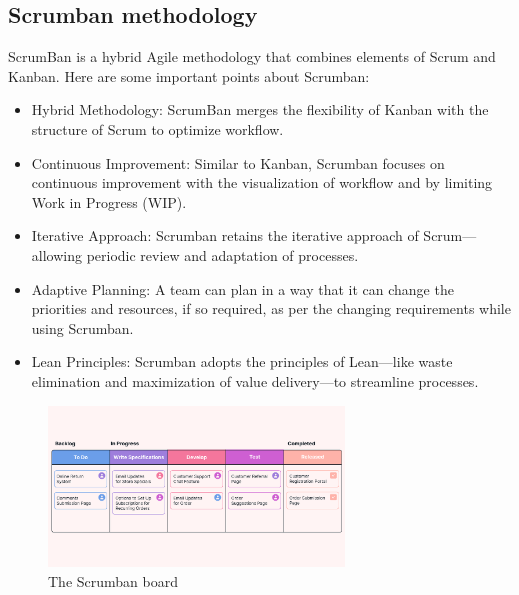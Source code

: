 \subsection{Scrumban methodology}
ScrumBan is a hybrid Agile methodology that combines elements of Scrum and Kanban. Here are some important points about Scrumban:

\begin{itemize}
    \item Hybrid Methodology: ScrumBan merges the flexibility of Kanban with the structure of Scrum to optimize workflow.
    \item Continuous Improvement: Similar to Kanban, Scrumban focuses on continuous improvement with the visualization of workflow and by limiting Work in Progress (WIP).
    \item Iterative Approach: Scrumban retains the iterative approach of Scrum—allowing periodic review and adaptation of processes.
    \item Adaptive Planning: A team can plan in a way that it can change the priorities and resources, if so required, as per the changing requirements while using Scrumban.
    \item Lean Principles: Scrumban adopts the principles of Lean—like waste elimination and maximization of value delivery—to streamline processes.
\end{itemize}

\begin{figure}[H]
    \centering
    \includegraphics[width=0.7\textwidth]{src/assets/chapters/Scrumban.png}
    \caption{The Scrumban board}
    \label{fig:Scrumban_image}
\end{figure}

\newpage
